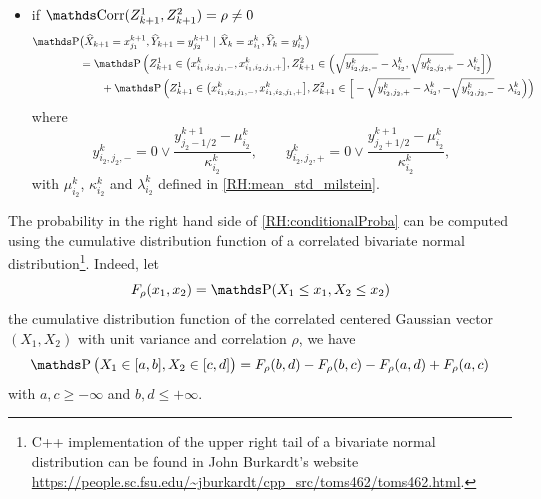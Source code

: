 \begin{lemme}
\begin{itemize}[wide=0pt]
		\item if $\Corr(Z_{k+1}^1, Z_{k+1}^2) = \rho \neq 0$
		      \begin{equation}\label{RH:conditionalProba}
			      \begin{aligned}
				      \Prob & \big( \widehat X_{k+1} = x_{j_1}^{k+1}, \widehat Y_{k+1} = y_{j_2}^{k+1} \mid \widehat X_k = x_{i_1}^k, \widehat Y_k = y_{i_2}^k \big)                                                                                  \\
				            & = \Prob \Big( Z_{k+1}^1 \in \big( x_{i_1,i_2,j_1,-}^{k}, x_{i_1,i_2,j_1,+}^{k} \big], Z_{k+1}^2 \in \Big( \sqrt{y_{i_2,j_2,-}^{k}} - \lambda_{i_2}^k, \sqrt{y_{i_2,j_2,+}^{k}} - \lambda_{i_2}^k \Big] \Big)            \\
				            & \qquad + \Prob \Big( Z_{k+1}^1 \in \big( x_{i_1,i_2,j_1,-}^{k}, x_{i_1,i_2,j_1,+}^{k} \big], Z_{k+1}^2 \in \Big[ - \sqrt{y_{i_2,j_2,+}^{k}} - \lambda_{i_2}^k, - \sqrt{y_{i_2,j_2,-}^{k}} - \lambda_{i_2}^k \Big) \Big) \\
			      \end{aligned}
		      \end{equation}
		      where
		      \begin{equation}
			      y_{i_2,j_2,-}^{k} = 0 \vee \frac{y_{j_2-1/2}^{k+1} - \mu_{i_2}^k}{\kappa_{i_2}^k},\qquad y_{i_2,j_2,+}^{k} = 0 \vee \frac{y_{j_2+1/2}^{k+1} - \mu_{i_2}^k}{\kappa_{i_2}^k},
		      \end{equation}
		      with $\mu_{i_2}^k$, $\kappa_{i_2}^k$ and $\lambda_{i_2}^k$ defined in \eqref{RH:mean_std_milstein}.

	\end{itemize}
\end{lemme}

\begin{remark}
	The probability in the right hand side of \eqref{RH:conditionalProba} can be computed using the cumulative distribution function of a correlated bivariate normal distribution\footnote{C++ implementation of the upper right tail of a bivariate normal distribution can be found in John Burkardt's website \url{https://people.sc.fsu.edu/~jburkardt/cpp_src/toms462/toms462.html}.}. Indeed, let
	$$F_{\rho}(x_1, x_2) = \Prob (X_1 \leq x_1, X_2 \leq x_2)$$
	the cumulative distribution function of the correlated centered Gaussian vector $(X_1, X_2)$ with unit variance and correlation $\rho$, we have
	\begin{equation}
		\Prob \big( X_1 \in [a,b], X_2 \in [c,d] \big) = F_{\rho}(b, d) - F_{\rho}(b, c) - F_{\rho}(a, d) + F_{\rho}(a, c)
	\end{equation}
	with $a,c \geq -\infty$ and $b,d \leq + \infty$.
\end{remark}

